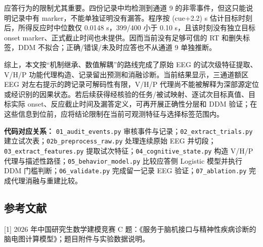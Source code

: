 应答行为的限制尤其重要。四份记录中均检测到通道 9
的非零事件，但这只能说明记录中有 marker，不能单独证明没有漏答。程序按
(cue+2.2) s 估计目标时刻后，所得反应时中位数仅 0.0148 s，399/400 小于
0.10 s，且该时刻没有独立目标 onset
marker、正式截止时间也未提供。因而当前没有足够可信的 RT 和删失标签，DDM
不拟合；正确/错误/未及时应答也不从通道 9 单独推断。

综上，本文按``机制继承、数值解耦''的路线完成了原始 EEG
的试次级特征提取、V/H/P
功能代理构造、记录留出预测和消融诊断。当前结果显示，三通道额区 EEG
对左右提示的跨记录可解码性有限，V/H/P
代理尚不能被解释为深部源定位或经识别的因果状态。若后续获得经核验的任务/被试映射、逐试次目标真值、目标实际
onset、反应截止时间及漏答定义，可再开展正确性分层和 DDM
验证；在这些信息到位前，应将结论限制在当前可观测特征与选择标签范围内。

\textbf{代码对应关系：} \texttt{01\_audit\_events.py}
审核事件与记录；\texttt{02\_extract\_trials.py}
建立试次表；\texttt{02b\_preprocess\_raw.py} 处理连续原始 EEG
并切段；\texttt{03\_extract\_features.py}
提取试次特征；\texttt{04\_cognitive\_state.py} 构造 V/H/P
代理与描述性路径；\texttt{05\_behavior\_model.py} 比较应答侧 Logistic
模型并执行 DDM 门槛判断；\texttt{06\_validate.py} 完成留一记录 EEG
验证；\texttt{07\_ablation.py} 完成代理消融与重建比较。

\hypertarget{ux53c2ux8003ux6587ux732e}{%
\subsection{参考文献}\label{ux53c2ux8003ux6587ux732e}}

{[}1{]} 2026 年中国研究生数学建模竞赛 C
题：《服务于脑机接口与精神性疾病诊断的脑电图计算模型》；题目附件与实验数据说明。
